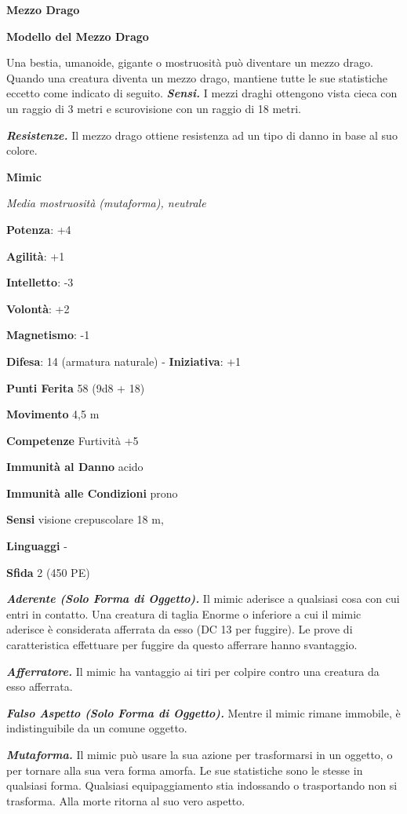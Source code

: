 \begin{multicols}{2}
\textbf{Mezzo Drago}

\textbf{Modello del Mezzo Drago}

Una bestia, umanoide, gigante o mostruosità può diventare un mezzo
drago. Quando una creatura diventa un mezzo drago, mantiene tutte le sue
statistiche eccetto come indicato di seguito. \emph{\textbf{Sensi.}} I
mezzi draghi ottengono vista cieca con un raggio di 3 metri e
scurovisione con un raggio di 18 metri.

\emph{\textbf{Resistenze.}} Il mezzo drago ottiene resistenza ad un tipo
di danno in base al suo colore.

\textbf{Mimic}

\emph{Media mostruosità (mutaforma), neutrale}

\textbf{Potenza}: +4

\textbf{Agilità}: +1

\textbf{Intelletto}: -3

\textbf{Volontà}: +2

\textbf{Magnetismo}: -1

\textbf{Difesa}: 14 (armatura naturale) - \textbf{Iniziativa}: +1

\textbf{Punti Ferita} 58 (9d8 + 18)

\textbf{Movimento} 4,5 m

\textbf{Competenze} Furtività +5

\textbf{Immunità al Danno} acido

\textbf{Immunità alle Condizioni} prono

\textbf{Sensi} visione crepuscolare 18 m, 

\textbf{Linguaggi} -

\textbf{Sfida} 2 (450 PE)

\emph{\textbf{Aderente (Solo Forma di Oggetto).}} Il mimic aderisce a
qualsiasi cosa con cui entri in contatto. Una creatura di taglia Enorme
o inferiore a cui il mimic aderisce è considerata afferrata da esso (DC
13 per fuggire). Le prove di caratteristica effettuare per fuggire da
questo afferrare hanno svantaggio.

\emph{\textbf{Afferratore.}} Il mimic ha vantaggio ai tiri per colpire
contro una creatura da esso afferrata.

\emph{\textbf{Falso Aspetto (Solo Forma di Oggetto).}} Mentre il mimic
rimane immobile, è indistinguibile da un comune oggetto.

\emph{\textbf{Mutaforma.}} Il mimic può usare la sua azione per
trasformarsi in un oggetto, o per tornare alla sua vera forma amorfa. Le
sue statistiche sono le stesse in qualsiasi forma. Qualsiasi
equipaggiamento stia indossando o trasportando non si trasforma. Alla
morte ritorna al suo vero aspetto.


\end{multicols}
